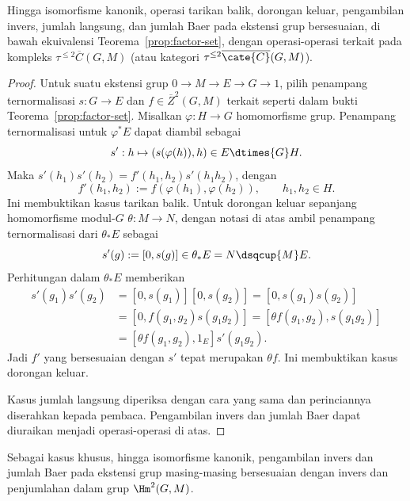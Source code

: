\begin{proposition}\label{prop:factor-set-operation}
	Hingga isomorfisme kanonik, operasi tarikan balik, dorongan keluar,
	pengambilan invers, jumlah langsung, dan jumlah Baer pada ekstensi grup
	bersesuaian, di bawah ekuivalensi Teorema~\ref{prop:factor-set}, dengan
	operasi-operasi terkait pada kompleks
	$\tau^{\leq2}\overline{C}(G,M)$ (atau kategori
	$\tau^{\leq2}\overline{\cate{C}}(G,M)$).
\end{proposition}
\begin{proof}
	Untuk suatu ekstensi grup $0\to M\to E\to G\to1$, pilih penampang
	ternormalisasi $s:G\to E$ dan $f\in\overline{Z}^2(G,M)$ terkait seperti
	dalam bukti Teorema~\ref{prop:factor-set}. Misalkan $\varphi:H\to G$
	homomorfisme grup. Penampang ternormalisasi untuk $\varphi^*E$ dapat diambil
	sebagai
	\[ s':h\mapsto(s(\varphi(h)),h)\in E\dtimes{G}H. \]
	Maka $s'(h_1)s'(h_2)=f'(h_1,h_2)s'(h_1h_2)$, dengan
	\[ f'(h_1,h_2):=f(\varphi(h_1),\varphi(h_2)),\qquad h_1,h_2\in H. \]
	Ini membuktikan kasus tarikan balik. Untuk dorongan keluar sepanjang
	homomorfisme modul-$G$ $\theta:M\to N$, dengan notasi di atas ambil
	penampang ternormalisasi dari $\theta_*E$ sebagai
	\[ s'(g):=[0,s(g)]\in\theta_*E=N\dsqcup{M}E. \]
	Perhitungan dalam $\theta_*E$ memberikan
	\begin{align*}
		s'(g_1)s'(g_2)&=[0,s(g_1)][0,s(g_2)]=[0,s(g_1)s(g_2)]\\
		&=[0,f(g_1,g_2)s(g_1g_2)]
		=[\theta f(g_1,g_2),s(g_1g_2)]\\
		&=[\theta f(g_1,g_2),1_E]s'(g_1g_2).
	\end{align*}
	Jadi $f'$ yang bersesuaian dengan $s'$ tepat merupakan $\theta f$.
	Ini membuktikan kasus dorongan keluar.

	Kasus jumlah langsung diperiksa dengan cara yang sama dan
	perinciannya diserahkan kepada pembaca. Pengambilan invers dan jumlah Baer
	dapat diuraikan menjadi operasi-operasi di atas.
\end{proof}

Sebagai kasus khusus, hingga isomorfisme kanonik, pengambilan invers dan jumlah
Baer pada ekstensi grup masing-masing bersesuaian dengan invers dan
penjumlahan dalam grup $\Hm^2(G,M)$.

